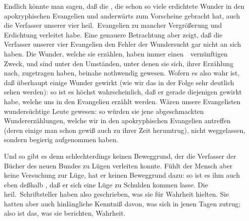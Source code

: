 \begin{aufza}
\item Endlich könnte man sagen, daß die , die schon so viele erdichtete Wunder in den apokryphischen Evangelien und anderwärts zum Vorscheine gebracht hat, auch die Verfasser unserer vier heil.\ Evangelien zu mancher Vergrößerung und Erdichtung verleitet habe. Eine genauere Betrachtung aber zeigt, daß die Verfasser unserer vier Evangelien den Fehler der Wundersucht gar nicht an sich haben. Die Wunder, welche sie erzählen, haben immer einen~\ vernünftigen Zweck, und sind unter den Umständen, unter denen sie sich, ihrer Erzählung nach, zugetragen haben, beinahe nothwendig gewesen. Wofern es also wahr ist, daß  überhaupt einige Wunder gewirkt (wie wir das in der Folge sehr deutlich sehen werden): so ist es höchst wahrscheinlich, daß er gerade diejenigen gewirkt habe, welche uns in den Evangelien erzählt werden.
Wären unsere Evangelisten wundersüchtige Leute gewesen: so würden sie jene abgeschmackten Wundererzählungen, welche wir in den apokryphischen Evangelien antreffen (deren einige man schon gewiß auch zu ihrer Zeit herumtrug), nicht weggelassen, sondern begierig aufgenommen haben.
\item Und so gibt es denn schlechterdings keinen Beweggrund, der die Verfasser der Bücher des neuen Bundes zu Lügen verleiten konnte. Fühlt der Mensch aber keine Versuchung zur Lüge, hat er keinen Beweggrund dazu: so ist es ihm auch eben deßhalb , daß er sich eine Lüge zu Schulden kommen lasse. Die heil.\ Schriftsteller haben also geschrieben, was sie für Wahrheit hielten. Sie hatten aber auch hinlängliche Kenntniß davon, was sich in jenen Tagen zutrug; also ist das, was sie berichten, Wahrheit.
\end{aufza}

